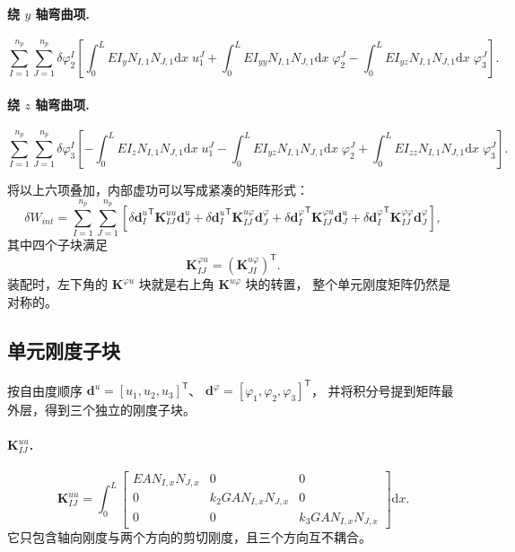 \documentclass[UTF8,a4paper,11pt]{ctexart}
\newcommand{\ud}{\mathrm{d}}
\newcommand{\bK}{\mathbf{K}}
\newcommand{\bd}{\mathbf{d}}
\begin{document}
\paragraph{绕 $y$ 轴弯曲项.}
\begin{equation}\label{eq:bendy}
\sum_{I=1}^{n_p}\sum_{J=1}^{n_p}\delta\varphi_2^I\left[
\int_0^L EI_yN_{I,1}N_{J,1}\ud x\;u_1^J
+\int_0^L EI_{yy}N_{I,1}N_{J,1}\ud x\;\varphi_2^J
-\int_0^L EI_{yz}N_{I,1}N_{J,1}\ud x\;\varphi_3^J
\right].
\end{equation}

\paragraph{绕 $z$ 轴弯曲项.}
\begin{equation}\label{eq:bendz}
\sum_{I=1}^{n_p}\sum_{J=1}^{n_p}\delta\varphi_3^I\left[
-\int_0^L EI_zN_{I,1}N_{J,1}\ud x\;u_1^J
-\int_0^L EI_{yz}N_{I,1}N_{J,1}\ud x\;\varphi_2^J
+\int_0^L EI_{zz}N_{I,1}N_{J,1}\ud x\;\varphi_3^J
\right].
\end{equation}

将以上六项叠加，内部虚功可以写成紧凑的矩阵形式：
\begin{equation}\label{eq:wint-disc}
\delta W_{int}
=\sum_{I=1}^{n_p}\sum_{J=1}^{n_p}\left[
\delta{\bd_I^u}^{\mathsf T}\bK_{IJ}^{uu}\bd_J^u
+\delta{\bd_I^u}^{\mathsf T}\bK_{IJ}^{u\varphi}\bd_J^\varphi
+\delta{\bd_I^\varphi}^{\mathsf T}\bK_{IJ}^{\varphi u}\bd_J^u
+\delta{\bd_I^\varphi}^{\mathsf T}\bK_{IJ}^{\varphi\varphi}\bd_J^\varphi
\right],
\end{equation}
其中四个子块满足
\begin{equation}\label{eq:symmetry}
\bK_{IJ}^{\varphi u}=\left(\bK_{JI}^{u\varphi}\right)^{\mathsf T}.
\end{equation}
装配时，左下角的 $\bK^{\varphi u}$ 块就是右上角 $\bK^{u\varphi}$ 块的转置，
整个单元刚度矩阵仍然是对称的。

\subsection{单元刚度子块}

按自由度顺序 $\bd^u=[u_1,u_2,u_3]^{\mathsf T}$、
$\bd^\varphi=[\varphi_1,\varphi_2,\varphi_3]^{\mathsf T}$，
并将积分号提到矩阵最外层，得到三个独立的刚度子块。

\paragraph{$\bK_{IJ}^{uu}$.}
\begin{equation}\label{eq:Kuu}
\bK_{IJ}^{uu}=\int_0^L
\begin{bmatrix}
EAN_{I,x}N_{J,x} & 0 & 0\\
0 & k_2GAN_{I,x}N_{J,x} & 0\\
0 & 0 & k_3GAN_{I,x}N_{J,x}
\end{bmatrix}\ud x.
\end{equation}
它只包含轴向刚度与两个方向的剪切刚度，且三个方向互不耦合。
\end{document}
